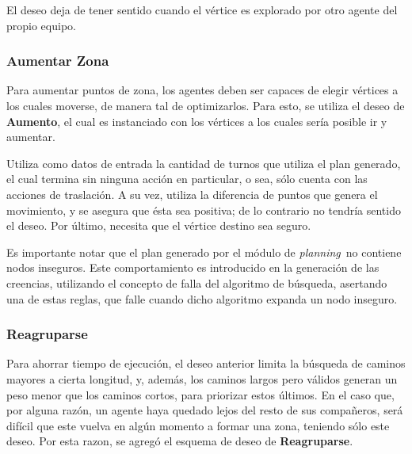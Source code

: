 \documentclass[oneside]{book}
\theoremstyle{definition}
\begin{document}
El deseo deja de tener sentido cuando el vértice es explorado por otro agente del propio
equipo. 

% 

\subsubsection{Aumentar Zona}

Para aumentar puntos de zona, los agentes deben ser capaces de elegir vértices a los 
cuales moverse, de manera tal de optimizarlos. Para esto, se utiliza el deseo de 
\textbf{Aumento}, el cual es instanciado con los vértices a los cuales sería posible ir y 
aumentar. 

Utiliza como datos de entrada la cantidad de turnos que utiliza el plan generado, el 
cual termina sin ninguna acción en particular, o sea, sólo cuenta con las acciones 
de traslación. A su vez, utiliza la diferencia de puntos que genera el movimiento, y 
se asegura que ésta sea positiva; de lo contrario no tendría sentido el deseo. Por 
último, necesita que el vértice destino sea seguro.

Es importante notar que el plan generado por el módulo de \textit{planning}\ no contiene
nodos inseguros. Este comportamiento es introducido en la generación de las creencias,
utilizando el concepto de falla del algoritmo de búsqueda, asertando una de estas reglas,
que falle cuando dicho algoritmo expanda un nodo inseguro.


\subsubsection{Reagruparse}

Para ahorrar tiempo de ejecución, el deseo anterior limita la búsqueda de caminos mayores
a cierta longitud, y, además, los caminos largos pero válidos generan un peso menor que 
los caminos cortos, para priorizar estos últimos. En el caso que, por alguna razón, un 
agente haya quedado lejos del resto de sus compañeros, será difícil que este vuelva en 
algún momento a formar una zona, teniendo sólo este deseo. Por esta razon, se agregó el
esquema de deseo de \textbf{Reagruparse}.
\end{document}
